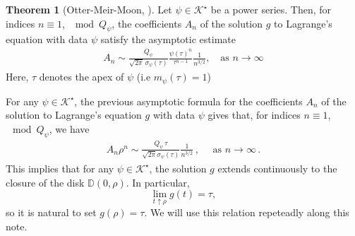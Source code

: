 \documentclass[11pt,a4paper,leqno]{amsart}
\theoremstyle{plain}
\theoremstyle{definition}
\numberwithin{equation}{section}
\newtheorem{thmletra}{Theorem}
\def\D{\mathbb{D}}
\def\E{\mathbf{E}}
\def\K{\mathcal{K}}
\begin{document}
	
	\begin{thmletra}[Otter-Meir-Moon, \cite{MeirMoon,Otter}]\label{thm: Otter-Meir-Moon} Let \( \psi \in \mathcal{K}^{\star} \) be a power series. Then, for indices $n \equiv 1$, $\mod Q_{\psi}$, the coefficients \( A_n \) of the solution \( g \) to Lagrange’s equation with data \( \psi \) satisfy the asymptotic estimate
		\begin{align*}
			A_n \sim \frac{Q_{\psi}}{\sqrt{2\pi}\, \sigma_{\psi}(\tau)}  \frac{\psi(\tau)^n}{\tau^{n-1}}  \frac{1}{n^{3/2}}, \quad \text{as } n \to \infty 
		\end{align*}
		Here, \( \tau \) denotes the apex of \( \psi \) (i.e $m_{\psi}(\tau) = 1$) 
	\end{thmletra}
	
	For any $\psi \in \K^{\star}$, the previous asymptotic formula for the coefficients $A_n$ of the solution to Lagrange's equation $g$ with data $\psi$ gives that, for indices $n \equiv 1$, $\mod Q_{\psi}$, we have
	\begin{align*}
		A_n\rho^{n} \sim \frac{Q_{\psi} \, \tau}{\sqrt{2\pi}\sigma_{\psi}(\tau)}\frac{1}{n^{3/2}}\,, \quad \text{ as } n \rightarrow \infty\,.
	\end{align*}
	This implies that for any \(\psi\in\mathcal{K}^\star\), the solution \(g\) extends continuously to the closure of the disk \({\D(0,\rho)}\).  In particular,  
	\[
	\lim_{t\uparrow\rho}g(t)=\tau,
	\]  
	so it is natural to set \(g(\rho)=\tau\). We will use this relation repeteadly along this note. 
	
\end{document}
